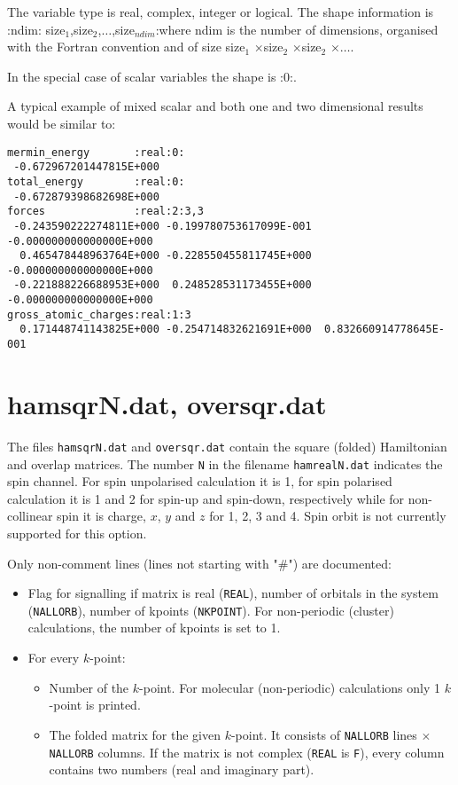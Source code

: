 The variable type is real, complex, integer or logical. The shape information is
\newline :ndim: size$_1$,size$_2$,$\ldots$,size$_{ndim}$:\newline where ndim is
the number of dimensions, organised with the Fortran convention and of size
size$_1$ $\times$size$_2$ $\times$size$_2$ $\times \ldots$.

In the special case of scalar variables the shape is :0:.

A typical example of mixed scalar and both one and two dimensional results would
be similar to:
\begin{verbatim}
mermin_energy       :real:0:
 -0.672967201447815E+000
total_energy        :real:0:
 -0.672879398682698E+000
forces              :real:2:3,3
 -0.243590222274811E+000 -0.199780753617099E-001 -0.000000000000000E+000
  0.465478448963764E+000 -0.228550455811745E+000 -0.000000000000000E+000
 -0.221888226688953E+000  0.248528531173455E+000 -0.000000000000000E+000
gross_atomic_charges:real:1:3
  0.171448741143825E+000 -0.254714832621691E+000  0.832660914778645E-001
\end{verbatim}

\section{hamsqrN.dat, oversqr.dat}
\label{sec:dftbp.hamsqr}

The files \verb|hamsqrN.dat| and \verb|oversqr.dat| contain the square
(folded) Hamiltonian and overlap matrices. The number \verb|N| in the
filename \verb|hamrealN.dat| indicates the spin channel. For spin
unpolarised calculation it is 1, for spin polarised calculation it is
1 and 2 for spin-up and spin-down, respectively while for non-collinear
spin it is charge, $x$, $y$ and $z$ for 1, 2, 3 and 4. Spin orbit is
not currently supported for this option.

Only non-comment lines (lines not starting with "\#") are documented:
\begin{itemize}

\item Flag for signalling if matrix is real (\verb|REAL|), number of
  orbitals in the system (\verb|NALLORB|), number of kpoints
  (\verb|NKPOINT|). For non-periodic (cluster) calculations, the
  number of kpoints is set to 1.

\item For every $k$-point:
  \begin{itemize}
  \item Number of the $k$-point. For molecular (non-periodic)
    calculations only 1 $k$-point is printed.
  \item The folded matrix for the given $k$-point. It consists of
    \verb|NALLORB| lines $\times$ \verb|NALLORB| columns. If the
    matrix is not complex (\verb|REAL| is \verb|F|), every column
    contains two numbers (real and imaginary part).
  \end{itemize}
\end{itemize}

